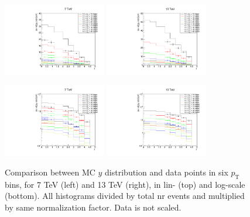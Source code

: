 \documentclass{article}
\newcommand{\pt}{p_\text{T}}
\begin{document}
\clearpage

\begin{figure}[h!]
\centering
\includegraphics[width = 0.4\textwidth]{y_dist_7.pdf}
\includegraphics[width = 0.4\textwidth]{y_dist_13.pdf}

\includegraphics[width = 0.4\textwidth]{y_dist_log_7.pdf}
\includegraphics[width = 0.4\textwidth]{y_dist_log_13.pdf}
\caption{Comparison between MC $y$ distribution and data points in six  $\pt$ bins, for 7 TeV (left) and 13 TeV (right), in lin- (top) and log-scale (bottom). All histograms divided by total nr events and multiplied by same normalization factor. Data is not scaled.}\label{f:y_comp}
\end{figure}
\end{document}
